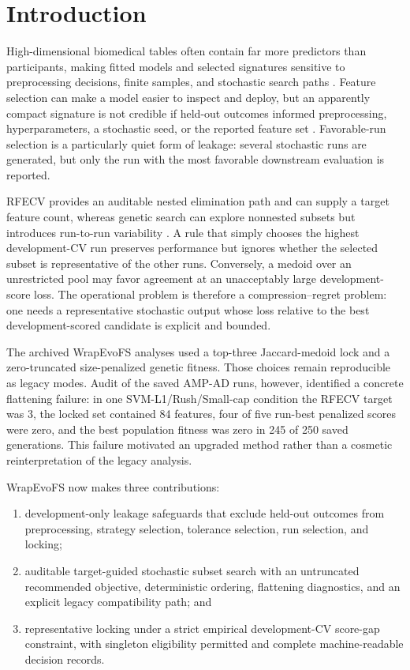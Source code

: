 \FloatBarrier
\section{Introduction}

High-dimensional biomedical tables often contain far more predictors than participants, making fitted models and selected signatures sensitive to preprocessing decisions, finite samples, and stochastic search paths \citep{ref01,ref02,ref03}. Feature selection can make a model easier to inspect and deploy, but an apparently compact signature is not credible if held-out outcomes informed preprocessing, hyperparameters, a stochastic seed, or the reported feature set \citep{ref06,ref07,ref08}. Favorable-run selection is a particularly quiet form of leakage: several stochastic runs are generated, but only the run with the most favorable downstream evaluation is reported.

RFECV provides an auditable nested elimination path and can supply a target feature count, whereas genetic search can explore nonnested subsets but introduces run-to-run variability \citep{ref12,ref13,ref15,ref16}. A rule that simply chooses the highest development-CV run preserves performance but ignores whether the selected subset is representative of the other runs. Conversely, a medoid over an unrestricted pool may favor agreement at an unacceptably large development-score loss. The operational problem is therefore a compression--regret problem: one needs a representative stochastic output whose loss relative to the best development-scored candidate is explicit and bounded.

The archived WrapEvoFS analyses used a top-three Jaccard-medoid lock and a zero-truncated size-penalized genetic fitness. Those choices remain reproducible as legacy modes. Audit of the saved AMP-AD runs, however, identified a concrete flattening failure: in one SVM-L1/Rush/Small-cap condition the RFECV target was 3, the locked set contained 84 features, four of five run-best penalized scores were zero, and the best population fitness was zero in 245 of 250 saved generations. This failure motivated an upgraded method rather than a cosmetic reinterpretation of the legacy analysis.

WrapEvoFS now makes three contributions:

\begin{enumerate}[label=\arabic*.]
\item development-only leakage safeguards that exclude held-out outcomes from preprocessing, strategy selection, tolerance selection, run selection, and locking;
\item auditable target-guided stochastic subset search with an untruncated recommended objective, deterministic ordering, flattening diagnostics, and an explicit legacy compatibility path; and
\item representative locking under a strict empirical development-CV score-gap constraint, with singleton eligibility permitted and complete machine-readable decision records.
\end{enumerate}

